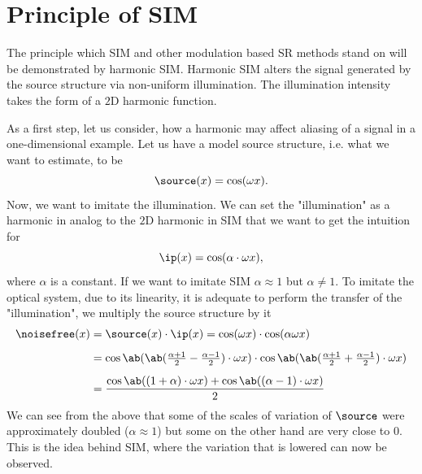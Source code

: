 \section{Principle of SIM}

The principle which \ac{SIM} and other modulation based \ac{SR} methods stand on will be demonstrated by harmonic
    \ac{SIM}.
Harmonic \ac{SIM} alters the signal generated by the source structure via non-uniform illumination.
The illumination intensity takes the form of a \(2\)D harmonic function.

As a first step, let us consider, how a harmonic may affect aliasing of a signal in a one-dimensional example.
Let us have a model source structure, i.e. what we want to estimate, to be
    \begin{equation*}
        \source(x) = \cos(\omega x).
    \end{equation*}
Now, we want to imitate the illumination.
We can set the "illumination" as a harmonic in analog to the \(2\)D harmonic in \ac{SIM} that we want to get the 
    intuition for
    \begin{equation*}
        \ip(x) = \cos(\alpha\cdot\omega x),
    \end{equation*}
    where \(\alpha\) is a constant.
If we want to imitate \ac{SIM} \(\alpha \approx 1\) but \(\alpha \neq 1\).
To imitate the optical system, due to its linearity, it is adequate to perform the transfer of the "illumination", we
    multiply the source structure by it
    \begin{align*}
        \noisefree(x) &= \source(x) \cdot \ip(x) = \cos(\omega x)\cdot\cos(\alpha\omega x) \\[0.5em]
                      &= \cos\ab(\ab(\tfrac{\alpha + 1}{2} - \tfrac{\alpha - 1}{2})\cdot\omega
                      x)\cdot\cos\ab(\ab(\tfrac{\alpha + 1}{2} + \tfrac{\alpha - 1}{2})\cdot\omega x) \\[0.5em]
                      &= \frac{\cos\ab((1 + \alpha)\cdot\omega x) + \cos\ab((\alpha - 1) \cdot\omega x)}{2}
    \end{align*}
We can see from the above that some of the scales of variation of \(\source\) were approximately doubled (\(\alpha \approx 1\)) but some on the other hand are very close to \(0\).
This is the idea behind \ac{SIM}, where the variation that is lowered can now be observed.

